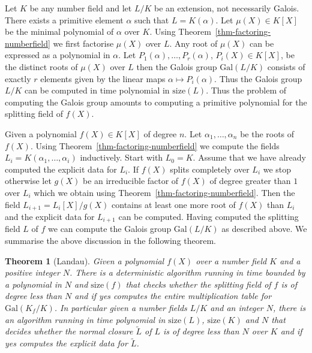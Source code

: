 \documentclass[11pt]{madras}%
\newtheorem{theorem}{Theorem}[chapter]
\theoremstyle{remark}
\newcommand{\Gal}[1]{{\ensuremath{\mathrm{Gal}\left(#1\right)}}}
\newcommand{\size}[1]{{\ensuremath{\mathrm{size}\left(#1\right)}}}
\begin{document}
Let $K$ be any number field and let $L/K$ be an extension, not
necessarily Galois. There exists a primitive element $\alpha$ such
that $L = K(\alpha)$. Let $\mu(X) \in K[X]$ be the minimal polynomial
of $\alpha$ over $K$.  Using Theorem~\ref{thm-factoring-numberfield}
we first factorise $\mu(X)$ over $L$. Any root of $\mu(X)$ can be
expressed as a polynomial in $\alpha$.  Let
$P_1(\alpha),\ldots,P_r(\alpha)$, $P_i(X) \in K[X]$, be the distinct
roots of $\mu(X)$ over $L$ then the Galois group $\Gal{L/K}$ consists
of exactly $r$ elements given by the linear maps $\alpha \mapsto
P_i(\alpha)$. Thus the Galois group $L/K$ can be computed in time
polynomial in $\size{L}$. Thus the problem of computing the Galois
group amounts to computing a primitive polynomial for the splitting
field of $f(X)$. 

Given a polynomial $f(X) \in K[X]$ of degree $n$.  Let
$\alpha_1,\ldots,\alpha_n$ be the roots of $f(X)$.  Using
Theorem~\ref{thm-factoring-numberfield} we compute the fields $L_i =
K(\alpha_1,\ldots,\alpha_i)$ inductively. Start with $L_0 = K$.
Assume that we have already computed the explicit data for $L_i$.  If
$f(X)$ splits completely over $L_i$ we stop otherwise let $g(X)$ be an
irreducible factor of $f(X)$ of degree greater than $1$ over $L_i$
which we obtain using Theorem~\ref{thm-factoring-numberfield}.  Then
the field $L_{i+1} = L_i[X]/g(X)$ contains at least one more root of
$f(X)$ than $L_i$ and the explicit data for $L_{i+1}$ can be computed.
Having computed the splitting field $L$ of $f$ we can compute the
Galois group $\Gal{L/K}$ as described above.  We summarise the above
discussion in the following theorem.

\begin{theorem}[Landau]\label{thm-landau-galois}
  Given a polynomial $f(X)$ over a number field $K$ and a positive
  integer $N$. There is a deterministic algorithm running in time
  bounded by a polynomial in $N$ and $\size{f}$ that checks whether
  the splitting field of $f$ is of degree less than $N$ and if yes
  computes the entire multiplication table for $\Gal{K_f/K}$. In
  particular given a number fields $L/K$ and an integer $N$, there is
  an algorithm running in time polynomial in $\size{L}$, $\size{K}$
  and $N$ that decides whether the normal closure $\tilde{L}$ of $L$
  is of degree less than $N$ over $K$ and if yes computes the explicit
  data for $\tilde{L}$.
\end{theorem}
\end{document}
